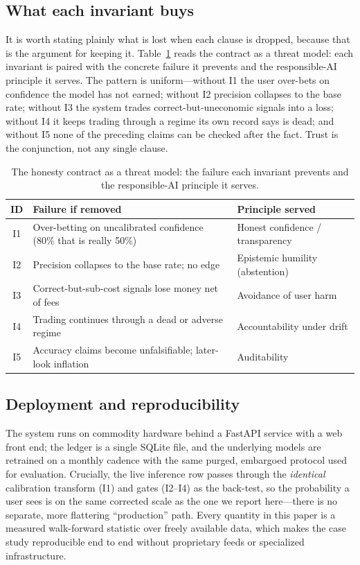 \documentclass[conference]{IEEEtran}
\begin{document}
\subsection{What each invariant buys}
It is worth stating plainly what is lost when each clause is dropped, because that
is the argument for keeping it. Table~\ref{tab:buys} reads the contract as a threat
model: each invariant is paired with the concrete failure it prevents and the
responsible-AI principle it serves. The pattern is uniform---without I1 the user
over-bets on confidence the model has not earned; without I2 precision collapses to
the base rate; without I3 the system trades correct-but-uneconomic signals into a
loss; without I4 it keeps trading through a regime its own record says is dead; and
without I5 none of the preceding claims can be checked after the fact. Trust is the
conjunction, not any single clause.

\begin{table}[t]
\centering
\caption{The honesty contract as a threat model: the failure each invariant
prevents and the responsible-AI principle it serves.}
\label{tab:buys}
\renewcommand{\arraystretch}{1.25}
\small
\begin{tabular}{@{}c p{} p{}@{}}
\toprule
\textbf{ID} & \textbf{Failure if removed} & \textbf{Principle served} \\
\midrule
I1 & Over-betting on uncalibrated confidence (80\% that is really 50\%) & Honest confidence / transparency \\
I2 & Precision collapses to the base rate; no edge & Epistemic humility (abstention) \\
I3 & Correct-but-sub-cost signals lose money net of fees & Avoidance of user harm \\
I4 & Trading continues through a dead or adverse regime & Accountability under drift \\
I5 & Accuracy claims become unfalsifiable; later-look inflation & Auditability \\
\bottomrule
\end{tabular}
\end{table}

\subsection{Deployment and reproducibility}
The system runs on commodity hardware behind a FastAPI service with a web front
end; the ledger is a single SQLite file, and the underlying models are retrained
on a monthly cadence with the same purged, embargoed protocol used for evaluation.
Crucially, the live inference row passes through the \emph{identical} calibration
transform (I1) and gates (I2--I4) as the back-test, so the probability a user sees
is on the same corrected scale as the one we report here---there is no separate,
more flattering ``production'' path. Every quantity in this paper is a measured
walk-forward statistic over freely available data, which makes the case study
reproducible end to end without proprietary feeds or specialized infrastructure.
\end{document}
